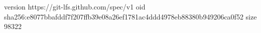 version https://git-lfs.github.com/spec/v1
oid sha256:e8077bbafddf7f207ffb39e08a26ef1781ac4ddd4978eb88380b949206ca0f52
size 98322
